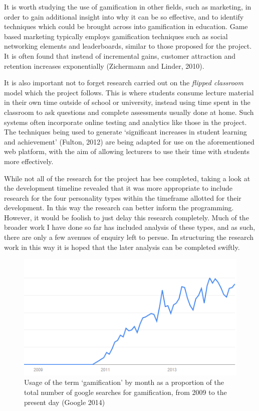 \documentclass[10pt,a4paper]{report}
\begin{document}
It is worth studying the use of gamification in other fields, such as marketing, in order to gain additional insight into why it can be so effective, and to identify techniques which could be brought across into gamification in education. Game based marketing typically employs gamification techniques such as social networking elements and leaderboards, similar to those proposed for the project. It is often found that instead of incremental gains, customer attraction and retention increases exponentially (Zichermann and Linder, 2010). 

It is also important not to forget research carried out on the \textit{flipped classroom} model which the project follows. This is where students consume lecture material in their own time outside of school or university, instead using time spent in the classroom to ask questions and complete assessments usually done at home. Such systems often incorporate online testing and analytics like those in the project. The techniques being used to generate `significant increases in student learning and achievement' (Fulton, 2012) are being adapted for use on the aforementioned web platform, with the aim of allowing lecturers to use their time with students more effectively.

While not all of the research for the project has bee completed, taking a look at the development timeline revealed that it was more appropriate to include research for the four personality types within the timeframe allotted for their development. In this way the research can better inform the programming. However, it would be foolish to just delay this research completely. Much of the broader work I have done so far has included analysis of these types, and as such, there are only a few avenues of enquiry left to persue. In structuring the research work in this way it is hoped that the later analysis can be completed swiftly.

\begin{figure}
	\includegraphics{../img/usage-graph.png}
	\caption{Usage of the term `gamification' by month as a proportion of the total number of google searches for gamification, from 2009 to the present day (Google 2014)}
	\label{usage}
\end{figure}
\end{document}
